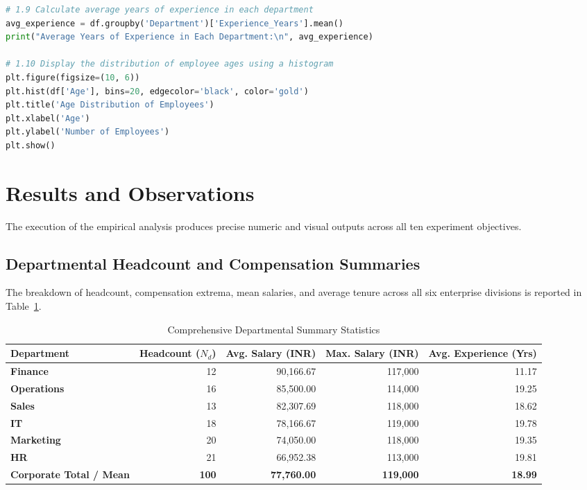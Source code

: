 \begin{lstlisting}[language=Python, caption={Experiment 1 Implementation from \texttt{experiment\_1.ipynb}}]
# 1.9 Calculate average years of experience in each department
avg_experience = df.groupby('Department')['Experience_Years'].mean()
print("Average Years of Experience in Each Department:\n", avg_experience)

# 1.10 Display the distribution of employee ages using a histogram
plt.figure(figsize=(10, 6))
plt.hist(df['Age'], bins=20, edgecolor='black', color='gold')
plt.title('Age Distribution of Employees')
plt.xlabel('Age')
plt.ylabel('Number of Employees')
plt.show()
\end{lstlisting}

\section{Results and Observations}
The execution of the empirical analysis produces precise numeric and visual outputs across all ten experiment objectives.

\subsection{Departmental Headcount and Compensation Summaries}
The breakdown of headcount, compensation extrema, mean salaries, and average tenure across all six enterprise divisions is reported in Table~\ref{tab:exp1_dept_summary}.
\begin{table}[H]
\centering
\small
\caption{Comprehensive Departmental Summary Statistics}
\label{tab:exp1_dept_summary}
\begin{tabular}{lrrrr}
\toprule
\textbf{Department} & \textbf{Headcount ($N_d$)} & \textbf{Avg. Salary (INR)} & \textbf{Max. Salary (INR)} & \textbf{Avg. Experience (Yrs)} \\
\midrule
\textbf{Finance} & 12 & 90,166.67 & 117,000 & 11.17 \\
\textbf{Operations} & 16 & 85,500.00 & 114,000 & 19.25 \\
\textbf{Sales} & 13 & 82,307.69 & 118,000 & 18.62 \\
\textbf{IT} & 18 & 78,166.67 & 119,000 & 19.78 \\
\textbf{Marketing} & 20 & 74,050.00 & 118,000 & 19.35 \\
\textbf{HR} & 21 & 66,952.38 & 113,000 & 19.81 \\
\midrule
\textbf{Corporate Total / Mean} & \textbf{100} & \textbf{77,760.00} & \textbf{119,000} & \textbf{18.99} \\
\bottomrule
\end{tabular}
\end{table}

